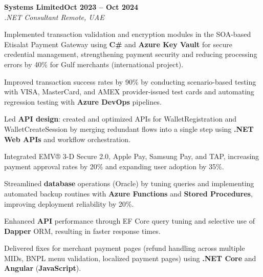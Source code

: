\documentclass[letterpaper,10pt]{article}
\newcommand{\headingBf}[2]{
  \hspace{10pt}\textbf{#1}\hfill\textbf{#2}\\
}
\newcommand{\headingIt}[2]{
  \hspace{10pt}\textit{#1}\hfill\textit{#2}\\
}
\newenvironment{resume_list}{
  \vspace{-7pt}
  \begin{itemize}[itemsep=-2px, parsep=1pt, leftmargin=30pt]
}{
  \end{itemize}
}
\begin{document}
\headingBf{Systems Limited}{Oct 2023 -- Oct 2024}
\headingIt{.NET Consultant \hfill Remote, UAE}{}
\begin{resume_list}
    \item Implemented transaction validation and encryption modules in the SOA-based Etisalat Payment Gateway using \textbf{C\#} and \textbf{Azure Key Vault} for secure credential management, strengthening payment security and reducing processing errors by 40\% for Gulf merchants (international project).
    \item Improved transaction success rates by 90\% by conducting scenario-based testing with VISA, MasterCard, and AMEX provider-issued test cards and automating regression testing with \textbf{Azure DevOps} pipelines.
    \item Led \textbf{API design}: created and optimized APIs for WalletRegistration and WalletCreateSession by merging redundant flows into a single step using \textbf{.NET Web APIs} and workflow orchestration.
    \item Integrated EMV® 3-D Secure 2.0, Apple Pay, Samsung Pay, and TAP, increasing payment approval rates by 20\% and expanding user adoption by 35\%.
    \item Streamlined \textbf{database} operations (Oracle) by tuning queries and implementing automated backup routines with \textbf{Azure Functions} and \textbf{Stored Procedures}, improving deployment reliability by 20\%.
    \item Enhanced \textbf{API} performance through EF Core query tuning and selective use of \textbf{Dapper} ORM, resulting in faster response times.
    \item Delivered fixes for merchant payment pages (refund handling across multiple MIDs, BNPL menu validation, localized payment pages) using \textbf{.NET Core} and \textbf{Angular} (\textbf{JavaScript}).
\end{resume_list}
\end{document}
